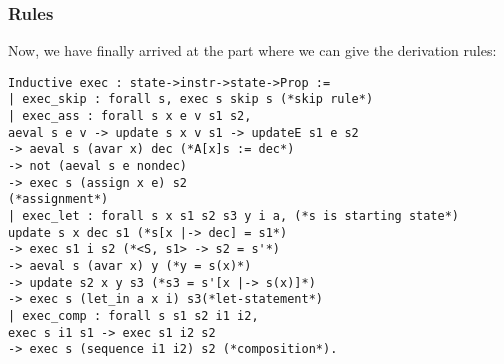 \subsubsection{Rules}
Now, we have finally arrived at the part where we can give the derivation rules:
\begin{verbatim}
Inductive exec : state->instr->state->Prop :=
| exec_skip : forall s, exec s skip s (*skip rule*)
| exec_ass : forall s x e v s1 s2,
aeval s e v -> update s x v s1 -> updateE s1 e s2
-> aeval s (avar x) dec (*A[x]s := dec*)
-> not (aeval s e nondec)
-> exec s (assign x e) s2
(*assignment*)
| exec_let : forall s x s1 s2 s3 y i a, (*s is starting state*)
update s x dec s1 (*s[x |-> dec] = s1*)
-> exec s1 i s2 (*<S, s1> -> s2 = s'*)
-> aeval s (avar x) y (*y = s(x)*)
-> update s2 x y s3 (*s3 = s'[x |-> s(x)]*)
-> exec s (let_in a x i) s3(*let-statement*)
| exec_comp : forall s s1 s2 i1 i2,
exec s i1 s1 -> exec s1 i2 s2 
-> exec s (sequence i1 i2) s2 (*composition*).
\end{verbatim}






